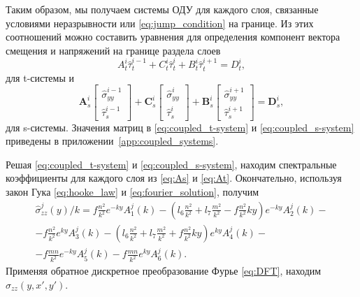 Таким образом, мы получаем системы ОДУ для каждого слоя, связанные условиями неразрывности или \eqref{eq:jump_condition} на границе. Из этих соотношений можно составить уравнения для определения компонент вектора смещения и напряжений на границе раздела слоев
\begin{equation}
    \label{eq:coupled_t-system}
    A_t^i \hat{\tau}_t^{i-1} + C_t^i \hat{\tau}_t^{i} + B_t^i \hat{\tau}_t^{i+1} = D_t^i,
\end{equation}
для t-системы и 
\begin{equation}
    \label{eq:coupled_s-system}
    \textbf{A}_s^i \left[
        \begin{array}{c}
            \hat{\sigma}_{yy}^{i-1} \\
            \hat{\tau}_s^{i-1}
        \end{array}\right] +
    \textbf{C}_s^i \left[
        \begin{array}{c}
            \hat{\sigma}_{yy}^{i} \\
            \hat{\tau}_s^{i}
        \end{array}\right] + 
    \textbf{B}_s^i \left[
        \begin{array}{c}
            \hat{\sigma}_{yy}^{i+1} \\
            \hat{\tau}_s^{i+1}
        \end{array}\right]
    = \textbf{D}_s^i,
\end{equation}
для s-системы. Значения матриц в \eqref{eq:coupled_t-system} и \eqref{eq:coupled_s-system} приведены в приложении~\ref{app:coupled_systems}.

Решая \eqref{eq:coupled_t-system} и \eqref{eq:coupled_s-system}, находим спектральные коэффициенты для каждого слоя из \eqref{eq:As} и \eqref{eq:At}. Окончательно, используя закон Гука \eqref{eq:hooke_law} и \eqref{eq:fourier_solution}, получим
\begin{multline}
    \label{eq:fourier_sigmazz}
    \hat{\sigma}^j_{zz}(y)/k = f\frac{n^2}{k^2}e^{-ky}A^j_1(k)
    - \left(l_6\frac{n^2}{k^2}+l_7\frac{m^2}{k^2}-f\frac{n^2}{k^2}ky \right)e^{-ky}A^j_2(k) - \\
    - f\frac{n^2}{k^2}e^{ky}A^j_3(k)
    - \left(l_6\frac{n^2}{k^2}+l_7\frac{m^2}{k^2}+f\frac{n^2}{k^2}ky \right)e^{ky}A^j_4(k) - \\
    - f\frac{mn}{k^2}e^{-ky}A^j_5(k)
    - f\frac{mn}{k^2}e^{ky}A^j_6(k).
\end{multline}
Применяя обратное дискретное преобразование Фурье \eqref{eq:DFT}, находим $\sigma_{zz}(y,x',y')$.

